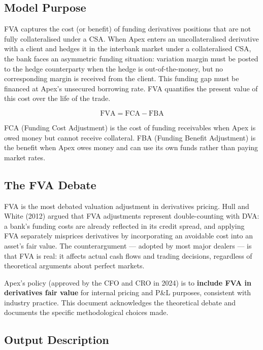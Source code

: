 \documentclass[11pt,a4paper]{article}
\begin{document}
\subsection{Model Purpose}

FVA captures the cost (or benefit) of funding derivatives positions that are not fully
collateralised under a CSA. When Apex enters an uncollateralised derivative with a client
and hedges it in the interbank market under a collateralised CSA, the bank faces an asymmetric
funding situation: variation margin must be posted to the hedge counterparty when the hedge is
out-of-the-money, but no corresponding margin is received from the client. This funding gap
must be financed at Apex's unsecured borrowing rate. FVA quantifies the present value of this
cost over the life of the trade.

\[
\mathrm{FVA} = \mathrm{FCA} - \mathrm{FBA}
\tag{1}
\]

FCA (Funding Cost Adjustment) is the cost of funding receivables when Apex is owed money but
cannot receive collateral. FBA (Funding Benefit Adjustment) is the benefit when Apex owes money
and can use its own funds rather than paying market rates.

\subsection{The FVA Debate}

FVA is the most debated valuation adjustment in derivatives pricing. Hull and White (2012)
argued that FVA adjustments represent double-counting with DVA: a bank's funding costs are
already reflected in its credit spread, and applying FVA separately misprices derivatives by
incorporating an avoidable cost into an asset's fair value. The counterargument --- adopted by
most major dealers --- is that FVA is real: it affects actual cash flows and trading decisions,
regardless of theoretical arguments about perfect markets.

Apex's policy (approved by the CFO and CRO in 2024) is to \textbf{include FVA in derivatives
fair value} for internal pricing and P\&L purposes, consistent with industry practice. This
document acknowledges the theoretical debate and documents the specific methodological choices
made.

\subsection{Output Description}
\end{document}
